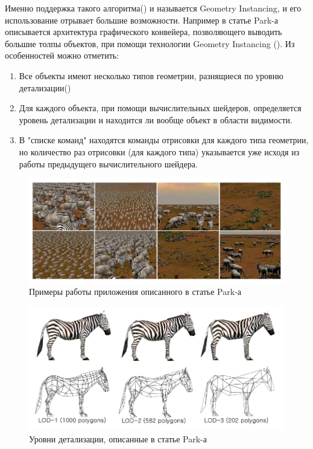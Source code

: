 	Именно поддержка такого алгоритма() и называется Geometry Instancing, и его использование отрывает большие возможности. Например в статье Park-а\cite{park2009fast} описывается архитектура графического конвейера, позволяющего выводить большие толпы объектов, при помощи технологии Geometry Instancing (). Из особенностей можно отметить:
	
	\begin{enumerate}[1.]
		\item Все объекты имеют несколько типов геометрии, разнящиеся по уровню детализации()
		\item Для каждого объекта, при помощи вычислительных шейдеров, определяется уровень детализации и находится ли вообще объект в области видимости.
		\item В "списке команд" находятся команды отрисовки для каждого типа геометрии, но количество раз отрисовки (для каждого типа) указывается уже исходя из работы предыдущего вычислительного шейдера.
	\end{enumerate}
	
	\begin{figure}[ht!] 
		\center
		\includegraphics [scale=0.5] {my_folder/images//park_screenshot}
		\caption{Примеры работы приложения описанного в статье Park-а\cite{park2009fast}} 
		\label{fig:park_screenshot}  
	\end{figure}
	
	\begin{figure}[ht!] 
		\center
		\includegraphics [scale=0.5] {my_folder/images//park_lod}
		\caption{Уровни детализации, описанные в статье Park-а\cite{park2009fast}} 
		\label{fig:park_lod}  
	\end{figure}
	\FloatBarrier
	
